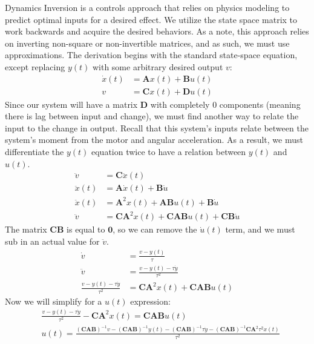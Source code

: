 \documentclass[journal]{IEEEtran}
\begin{document}
Dynamics Inversion is a controls approach that relies on physics modeling to predict optimal inputs for a desired effect. 
We utilize the state space matrix to work backwards and acquire the desired behaviors. As a note, 
this approach relies on inverting non-square or non-invertible matrices, and as such, we must use approximations. 
The derivation begins with the standard state-space equation, except replacing $y(t)$ with some arbitrary desired output $v$:
\begin{align}
\dot{x}(t) &= \mathbf{A}x(t) + \mathbf{B}u(t) \\
v &= \mathbf{C}x(t) + \mathbf{D}u(t)
\end{align}
Since our system will have a matrix $\mathbf{D}$ with completely $0$ components (meaning there is lag between input and change), 
we must find another way to relate the input to the change in output. Recall that this system's inputs relate between the system's 
moment from the motor and angular acceleration. As a result, we must differentiate the $y(t)$ equation twice to have a relation between $y(t)$ and $u(t)$.
\begin{align}
\ddot{v} &= \mathbf{C}\ddot{x}(t) \\
\ddot{x}(t) &= \mathbf{A}\dot{x}(t) + \mathbf{B}\dot{u} \\
\ddot{x}(t) &= \mathbf{A}^{2}x(t) + \mathbf{A}\mathbf{B}u(t) + \mathbf{B}\dot{u} \\
\ddot{v} &= \mathbf{C}\mathbf{A}^{2}x(t) + \mathbf{C}\mathbf{A}\mathbf{B}u(t) + \mathbf{C}\mathbf{B}\dot{u}
\end{align}
The matrix $\mathbf{C}\mathbf{B}$ is equal to $\mathbf{0}$, so we can remove the $\dot{u}(t)$ term, 
and we must sub in an actual value for $\ddot{v}$.
\begin{align}
\dot{v} &= \frac{v-y(t)}{\tau} \\
\ddot{v} &= \frac{v-y(t) -\tau\dot{y}}{\tau^{2}} \\
\frac{v-y(t) -\tau\dot{y}}{\tau^{2}} &= \mathbf{C}\mathbf{A}^{2}x(t) + \mathbf{C}\mathbf{A}\mathbf{B}u(t)
\end{align}
Now we will simplify for a $u(t)$ expression:
\begin{align}
& \frac{v-y(t) -\tau\dot{y}}{\tau^{2}} - \mathbf{C}\mathbf{A}^{2}x(t) = \mathbf{C}\mathbf{A}\mathbf{B}u(t) \\
&u(t) = \frac{(\mathbf{C}\mathbf{A}\mathbf{B})^{-1}v-(\mathbf{C}\mathbf{A}\mathbf{B})^{-1}y(t) - 
(\mathbf{C}\mathbf{A}\mathbf{B})^{-1}\tau\dot{y} - 
(\mathbf{C}\mathbf{A}\mathbf{B})^{-1}\mathbf{C}\mathbf{A}^{2}\tau^{2}x(t)}{\tau^{2}}
\end{align}
\end{document}
